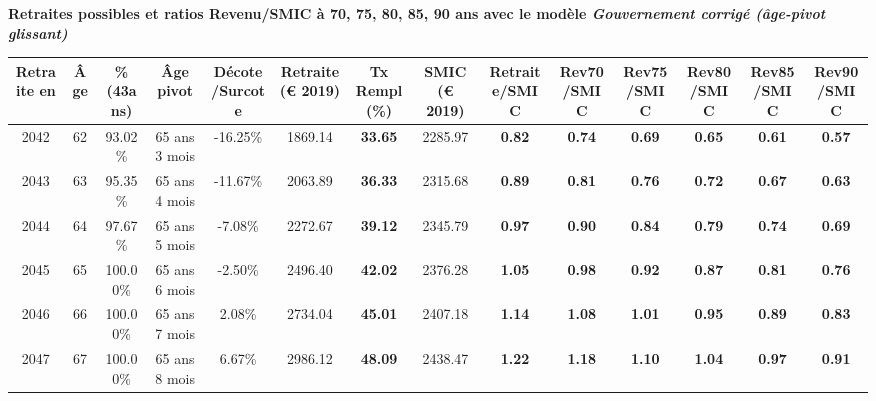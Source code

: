  \vspace{0.1cm} 
{\bf \noindent Retraites possibles et ratios Revenu/SMIC à 70, 75, 80, 85, 90 ans avec le modèle \emph{Gouvernement corrigé (âge-pivot glissant)}}  
 
\begin{adjustbox}{max width=\textwidth} 
\begin{tabular}[htb]{|c|c||c|c|c||c|c||c||c|c|c|c|c|c|} 
\hline 
 Retraite en &  Âge &  \%(43ans) &  Âge pivot &  Décote/Surcote &  Retraite (\euro{} 2019) &  Tx Rempl(\%) &  SMIC (\euro{} 2019) &  Retraite/SMIC &  Rev70/SMIC &  Rev75/SMIC &  Rev80/SMIC &  Rev85/SMIC &  Rev90/SMIC \\ 
\hline \hline 
 2042 &  62 &  93.02\% &  65 ans 3 mois &  -16.25\% &  1869.14 &  {\bf 33.65} &  2285.97 &  {\bf {\color{red} 0.82}} &  {\bf {\color{red} 0.74}} &  {\bf {\color{red} 0.69}} &  {\bf {\color{red} 0.65}} &  {\bf {\color{red} 0.61}} &  {\bf {\color{red} 0.57}} \\ 
\hline 
 2043 &  63 &  95.35\% &  65 ans 4 mois &  -11.67\% &  2063.89 &  {\bf 36.33} &  2315.68 &  {\bf {\color{red} 0.89}} &  {\bf {\color{red} 0.81}} &  {\bf {\color{red} 0.76}} &  {\bf {\color{red} 0.72}} &  {\bf {\color{red} 0.67}} &  {\bf {\color{red} 0.63}} \\ 
\hline 
 2044 &  64 &  97.67\% &  65 ans 5 mois &  -7.08\% &  2272.67 &  {\bf 39.12} &  2345.79 &  {\bf {\color{red} 0.97}} &  {\bf {\color{red} 0.90}} &  {\bf {\color{red} 0.84}} &  {\bf {\color{red} 0.79}} &  {\bf {\color{red} 0.74}} &  {\bf {\color{red} 0.69}} \\ 
\hline 
 2045 &  65 &  100.00\% &  65 ans 6 mois &  -2.50\% &  2496.40 &  {\bf 42.02} &  2376.28 &  {\bf 1.05} &  {\bf {\color{red} 0.98}} &  {\bf {\color{red} 0.92}} &  {\bf {\color{red} 0.87}} &  {\bf {\color{red} 0.81}} &  {\bf {\color{red} 0.76}} \\ 
\hline 
 2046 &  66 &  100.00\% &  65 ans 7 mois &  2.08\% &  2734.04 &  {\bf 45.01} &  2407.18 &  {\bf 1.14} &  {\bf 1.08} &  {\bf 1.01} &  {\bf {\color{red} 0.95}} &  {\bf {\color{red} 0.89}} &  {\bf {\color{red} 0.83}} \\ 
\hline 
 2047 &  67 &  100.00\% &  65 ans 8 mois &  6.67\% &  2986.12 &  {\bf 48.09} &  2438.47 &  {\bf 1.22} &  {\bf 1.18} &  {\bf 1.10} &  {\bf 1.04} &  {\bf {\color{red} 0.97}} &  {\bf {\color{red} 0.91}} \\ 
\hline 
\hline 
\end{tabular} 
\end{adjustbox} 
 
